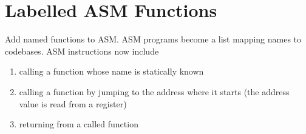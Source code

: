 \documentclass{article}
\begin{document}
\section{Labelled ASM Functions}
Add named functions to ASM. ASM programs become a list mapping names to codebases. ASM instructions now include
\begin{enumerate}
    \item calling a function whose name is statically known
    \item calling a function by jumping to the address where it starts (the address value is read from a register)
    \item returning from a called function
\end{enumerate}
\end{document}
